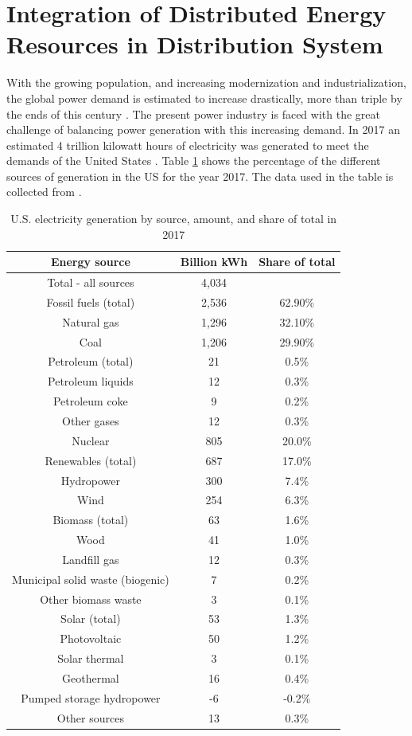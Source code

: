 \section{Integration of Distributed Energy Resources in Distribution System}
With the growing population, and increasing modernization and industrialization, the global power demand is estimated to increase drastically, more than triple by the ends of this century \cite{INTRO1}. The present power industry is faced with the great challenge of balancing power generation with this increasing demand. In 2017 an estimated 4 trillion kilowatt hours of electricity was generated to meet the demands of the United States \cite{EIA2018}. Table \ref{tab:IN1} shows the percentage of the different sources of generation in the US for the year 2017. The data used in the table is collected from \cite{EIA2018}.

\begin{table}[ht]
\label{tab:IN1}
\caption[U.S. electricity generation by source, amount, and share of total in 2017]{U.S. electricity generation by source, amount, and share of total in 2017 \cite{EIA2018}}
\centering
\begin{tabular}{|c|c|c|}
\hline
Energy source & Billion kWh & Share of total \\ \hline
Total - all sources & 4,034 &  \\ \hline
Fossil fuels (total) & 2,536 & 62.90\% \\ \hline
Natural gas & 1,296 & 32.10\% \\ \hline
Coal & 1,206 & 29.90\% \\ \hline
Petroleum (total) & 21 & 0.5\% \\ \hline
Petroleum liquids & 12 & 0.3\% \\ \hline
Petroleum coke & 9 & 0.2\% \\ \hline
Other gases & 12 & 0.3\% \\ \hline
Nuclear & 805 & 20.0\% \\ \hline
Renewables (total) & 687 & 17.0\% \\ \hline
Hydropower & 300 & 7.4\% \\ \hline
Wind & 254 & 6.3\% \\ \hline
Biomass (total) & 63 & 1.6\% \\ \hline
Wood & 41 & 1.0\% \\ \hline
Landfill gas & 12 & 0.3\% \\ \hline
Municipal solid waste (biogenic) & 7 & 0.2\% \\ \hline
Other biomass waste & 3 & 0.1\% \\ \hline
Solar (total) & 53 & 1.3\% \\ \hline
Photovoltaic & 50 & 1.2\% \\ \hline
Solar thermal & 3 & 0.1\% \\ \hline
Geothermal & 16 & 0.4\% \\ \hline
Pumped storage hydropower & -6 & -0.2\% \\ \hline
Other sources & 13 & 0.3\% \\ \hline
\end{tabular}
\end{table}

